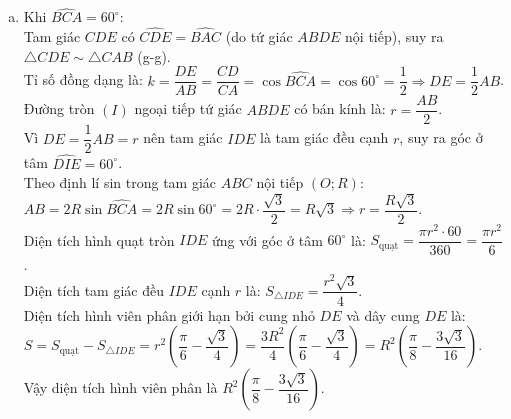 \begin{bt}
{\begin{enumerate}[a)]
    Vì $I$ là trung điểm của đường chéo $AB$ trong hình bình hành $AKBH$ nên $I$ đồng thời là trung điểm của đường chéo $HK$.\\
    Vậy ba điểm $H, I, K$ thẳng hàng.
    \item Khi $\widehat{BCA} = 60^\circ$:\\
    Tam giác $CDE$ có $\widehat{CDE} = \widehat{BAC}$ (do tứ giác $ABDE$ nội tiếp), suy ra $\triangle CDE \sim \triangle CAB$ (g-g).\\
    Tỉ số đồng dạng là:
    $k = \dfrac{DE}{AB} = \dfrac{CD}{CA} = \cos \widehat{BCA} = \cos 60^\circ = \dfrac{1}{2} \Rightarrow DE = \dfrac{1}{2}AB$.\\
    Đường tròn $(I)$ ngoại tiếp tứ giác $ABDE$ có bán kính là:
    $r = \dfrac{AB}{2}$.\\
    Vì $DE = \dfrac{1}{2}AB = r$ nên tam giác $IDE$ là tam giác đều cạnh $r$, suy ra góc ở tâm $\widehat{DIE} = 60^\circ$.\\
    Theo định lí sin trong tam giác $ABC$ nội tiếp $(O; R)$:
    $AB = 2R \sin \widehat{BCA} = 2R \sin 60^\circ = 2R \cdot \dfrac{\sqrt{3}}{2} = R\sqrt{3} \Rightarrow r = \dfrac{R\sqrt{3}}{2}$.\\
    Diện tích hình quạt tròn $IDE$ ứng với góc ở tâm $60^\circ$ là:
    $S_{\text{quạt}} = \dfrac{\pi r^2 \cdot 60}{360} = \dfrac{\pi r^2}{6}$.\\
    Diện tích tam giác đều $IDE$ cạnh $r$ là:
    $S_{\triangle IDE} = \dfrac{r^2\sqrt{3}}{4}$.\\
    Diện tích hình viên phân giới hạn bởi cung nhỏ $DE$ và dây cung $DE$ là:
    $S = S_{\text{quạt}} - S_{\triangle IDE} = r^2\left(\dfrac{\pi}{6} - \dfrac{\sqrt{3}}{4}\right) = \dfrac{3R^2}{4}\left(\dfrac{\pi}{6} - \dfrac{\sqrt{3}}{4}\right) = R^2\left(\dfrac{\pi}{8} - \dfrac{3\sqrt{3}}{16}\right)$.\\
    Vậy diện tích hình viên phân là $R^2\left(\dfrac{\pi}{8} - \dfrac{3\sqrt{3}}{16}\right)$.
\end{enumerate}
}
\end{bt}

